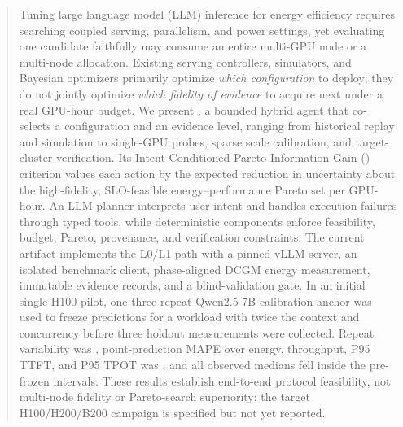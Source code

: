 \begin{abstract}
Tuning large language model (LLM) inference for energy efficiency requires
searching coupled serving, parallelism, and power settings, yet evaluating one
candidate faithfully may consume an entire multi-GPU node or a multi-node
allocation.  Existing serving controllers, simulators, and Bayesian optimizers
primarily optimize \emph{which configuration} to deploy; they do not jointly
optimize \emph{which fidelity of evidence} to acquire next under a real
GPU-hour budget.  We present \system{}, a bounded hybrid agent that co-selects a
configuration and an evidence level, ranging from historical replay and
simulation to single-GPU probes, sparse scale calibration, and target-cluster
verification.  Its Intent-Conditioned Pareto Information Gain (\ipig{})
criterion values each action by the expected reduction in uncertainty about
the high-fidelity, SLO-feasible energy--performance Pareto set per GPU-hour.
An LLM planner interprets user intent and handles execution failures through
typed tools, while deterministic components enforce feasibility, budget,
Pareto, provenance, and verification constraints.  The current artifact
implements the L0/L1 path with a pinned vLLM server, an isolated benchmark
client, phase-aligned DCGM energy measurement, immutable evidence records, and
a blind-validation gate.  In an initial single-H100 pilot, one three-repeat
Qwen2.5-7B calibration anchor was used to freeze predictions for a workload
with twice the context and concurrency before three holdout measurements were
collected.  Repeat variability was \PilotCVRange{}, point-prediction MAPE over
energy, throughput, P95 TTFT, and P95 TPOT was \PilotMeanMAPE{}, and all
\PilotCoverage{} observed medians fell inside the pre-frozen intervals.  These
results establish end-to-end protocol feasibility, not multi-node fidelity or
Pareto-search superiority; the target H100/H200/B200 campaign is specified but
not yet reported.
\end{abstract}
